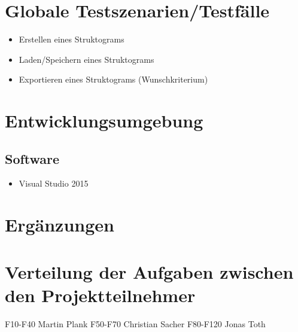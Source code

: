 \documentclass[a4paper,10pt]{report}
\begin{document}
\section{Globale Testszenarien/Testfälle}
\begin{itemize}
\item  Erstellen eines Struktograms
\item  Laden/Speichern eines Struktograms
\item  Exportieren eines Struktograms (Wunschkriterium)
\end{itemize}
\section{Entwicklungsumgebung}
\subsection{Software}
\begin{itemize}
\item Visual Studio 2015
\end{itemize}
\section{Ergänzungen}
\section{Verteilung der Aufgaben zwischen den Projektteilnehmer}
F10-F40 Martin Plank
F50-F70 Christian Sacher
F80-F120 Jonas Toth
\end{document}
